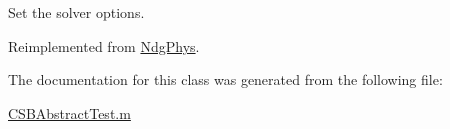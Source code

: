 Set the solver options. 



Reimplemented from \hyperlink{class_ndg_phys_a5cd323275f4098db166471c4b078ed17}{Ndg\+Phys}.



The documentation for this class was generated from the following file\+:\begin{DoxyCompactItemize}
\item 
\hyperlink{_c_s_b_abstract_test_8m}{C\+S\+B\+Abstract\+Test.\+m}\end{DoxyCompactItemize}
